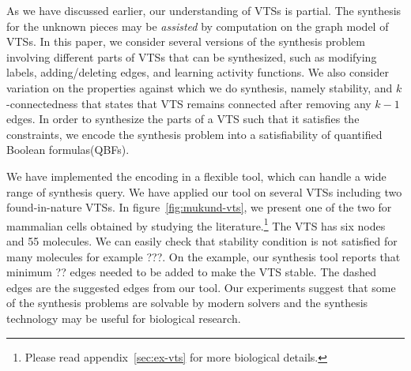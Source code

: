 %
As we have discussed earlier, our understanding of VTSs is partial.
%
%
%
%
The synthesis for the unknown pieces may be {\em assisted} by computation on
the graph model of VTSs.
%
In this paper, we consider several versions of the synthesis problem
involving different parts of VTSs that can be synthesized, such as
modifying labels, adding/deleting edges, and learning activity functions.
%
We also consider variation on the properties against which we do
synthesis, namely stability, and $k$-connectedness that states that
VTS remains connected after removing any $k-1$ edges.
%
In order to synthesize the parts of a VTS such that it satisfies the
constraints, we encode the synthesis problem into a satisfiability of
quantified Boolean formulas(QBFs). 
%

We have implemented the encoding in a flexible tool,
which can handle a wide range of synthesis query.
%
We have applied our tool on several VTSs including two found-in-nature
VTSs.
%
In figure~\ref{fig:mukund-vts}, we present one of the two for
mammalian cells obtained by studying the
literature.\footnote{Please read appendix~\ref{sec:ex-vts} for more biological details.}
%
The VTS has six nodes and 55 molecules.
%
We can easily check that stability condition is not satisfied for
many molecules for example ???.
%
On the example, our synthesis tool reports that minimum ?? edges needed
to be added to make the VTS stable.
%
The dashed edges are the suggested edges from our tool.
%
Our experiments suggest that some of the synthesis problems are
solvable by modern solvers and the synthesis technology may be useful
for biological research.
%

